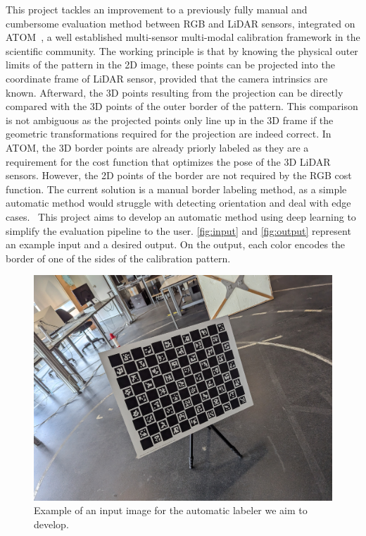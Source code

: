 This project tackles an improvement to a previously fully manual and cumbersome evaluation method between RGB and LiDAR sensors,
integrated on ATOM~\cite{atom}, a well established multi-sensor multi-modal calibration framework in the
scientific community. The working principle is that by knowing the
physical outer limits of the pattern in the 2D image, these points can be projected into the coordinate frame of LiDAR sensor, provided
that the camera intrinsics are known. Afterward, the 3D points resulting from the projection can be directly compared with the 3D
points of the outer border of the pattern. This comparison is not ambiguous as the projected points only line up in the 3D frame if the
geometric transformations required for the projection are indeed correct. In ATOM, the 3D border points are already priorly labeled as
they are a requirement for the cost function that optimizes the pose of the 3D LiDAR sensors. However, the 2D points of the border are not
required by the RGB cost function. The current solution is a manual border labeling method, as a
simple automatic method would struggle with detecting orientation and deal with edge cases.~\cite{camera_lidar} This
project aims to develop an automatic method using deep learning to simplify the evaluation pipeline to the user. \autoref{fig:input}
and \autoref{fig:output} represent an example input and a desired output. On the output, each color encodes the border of one of the
sides of the calibration pattern.

\begin{figure}[h]
    \centering
    \includegraphics[width=0.8\linewidth]{resources/images/pattern_28.jpg}
    \caption{Example of an input image for the automatic labeler we aim to develop.}
    \label{fig:input}
\end{figure}

